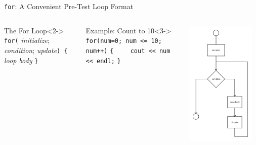 \documentclass[]{beamer}
\begin{document}
\begin{frame}[fragile]{\texttt{for}: A Convenient Pre-Test Loop Format}
\begin{columns}
    \begin{block}{The For Loop}<2->
        \verb!for(! \textit{initialize}; \textit{condition}; \textit{update}\verb!) {!
        \newline\verb!    !\textit{loop body}
        \newline\verb!}!
    \end{block}

    \begin{block}{Example: Count to 10}<3->
        \verb!for(num=0; num <= 10; num++)!
        \newline\verb!{!
        \newline\verb!    cout << num << endl;!
        \newline\verb!}!
    \end{block}

    \includegraphics[width=0.9\textwidth]{images/for}
\end{columns}
\end{frame}
\end{document}
